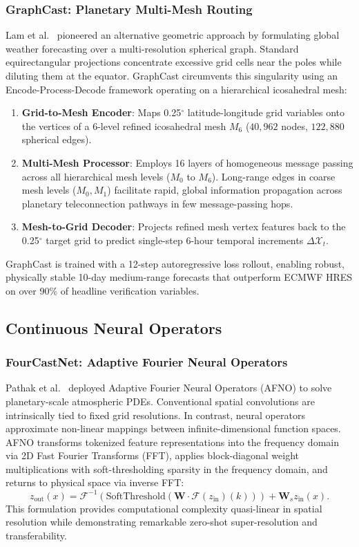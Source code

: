 \subsubsection{GraphCast: Planetary Multi-Mesh Routing}
Lam et al.~\cite{lam2023graphcast} pioneered an alternative geometric approach by formulating global weather forecasting over a multi-resolution spherical graph. Standard equirectangular projections concentrate excessive grid cells near the poles while diluting them at the equator. GraphCast circumvents this singularity using an Encode-Process-Decode framework operating on a hierarchical icosahedral mesh:
\begin{enumerate}
    \item \textbf{Grid-to-Mesh Encoder}: Maps 0.25$^\circ$ latitude-longitude grid variables onto the vertices of a 6-level refined icosahedral mesh $M_6$ ($40{,}962$ nodes, $122{,}880$ spherical edges).
    \item \textbf{Multi-Mesh Processor}: Employs 16 layers of homogeneous message passing across all hierarchical mesh levels ($M_0$ to $M_6$). Long-range edges in coarse mesh levels ($M_0, M_1$) facilitate rapid, global information propagation across planetary teleconnection pathways in few message-passing hops.
    \item \textbf{Mesh-to-Grid Decoder}: Projects refined mesh vertex features back to the 0.25$^\circ$ target grid to predict single-step 6-hour temporal increments $\Delta \mathcal{X}_t$.
\end{enumerate}
GraphCast is trained with a 12-step autoregressive loss rollout, enabling robust, physically stable 10-day medium-range forecasts that outperform ECMWF HRES on over 90\% of headline verification variables.

\subsection{Continuous Neural Operators}

\subsubsection{FourCastNet: Adaptive Fourier Neural Operators}
Pathak et al.~\cite{pathak2022fourcastnet} deployed Adaptive Fourier Neural Operators (AFNO) to solve planetary-scale atmospheric PDEs. Conventional spatial convolutions are intrinsically tied to fixed grid resolutions. In contrast, neural operators approximate non-linear mappings between infinite-dimensional function spaces. AFNO transforms tokenized feature representations into the frequency domain via 2D Fast Fourier Transforms (FFT), applies block-diagonal weight multiplications with soft-thresholding sparsity in the frequency domain, and returns to physical space via inverse FFT:
\begin{equation}
    z_{\text{out}}(x) = \mathcal{F}^{-1}\left( \text{SoftThreshold}\left(\mathbf{W} \cdot \mathcal{F}(z_{\text{in}})(k) \right) \right) + \mathbf{W}_s z_{\text{in}}(x).
\end{equation}
This formulation provides computational complexity quasi-linear in spatial resolution while demonstrating remarkable zero-shot super-resolution and transferability.

